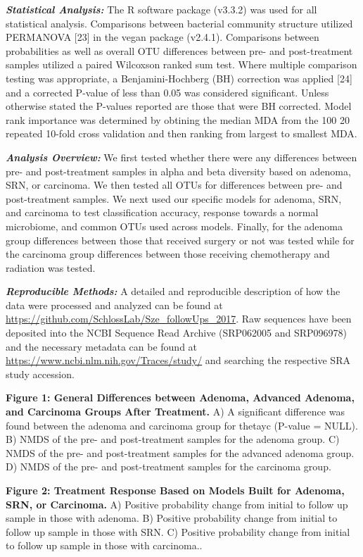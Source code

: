 \documentclass[12pt,]{article}
\begin{document}
\textbf{\emph{Statistical Analysis:}} The R software package (v3.3.2)
was used for all statistical analysis. Comparisons between bacterial
community structure utilized PERMANOVA {[}23{]} in the vegan package
(v2.4.1). Comparisons between probabilities as well as overall OTU
differences between pre- and post-treatment samples utilized a paired
Wilcoxson ranked sum test. Where multiple comparison testing was
appropriate, a Benjamini-Hochberg (BH) correction was applied {[}24{]}
and a corrected P-value of less than 0.05 was considered significant.
Unless otherwise stated the P-values reported are those that were BH
corrected. Model rank importance was determined by obtining the median
MDA from the 100 20 repeated 10-fold cross validation and then ranking
from largest to smallest MDA.

\textbf{\emph{Analysis Overview:}} We first tested whether there were
any differences between pre- and post-treatment samples in alpha and
beta diversity based on adenoma, SRN, or carcinoma. We then tested all
OTUs for differences between pre- and post-treatment samples. We next
used our specific models for adenoma, SRN, and carcinoma to test
classification accuracy, response towards a normal microbiome, and
common OTUs used across models. Finally, for the adenoma group
differences between those that received surgery or not was tested while
for the carcinoma group differences between those receiving chemotherapy
and radiation was tested.

\textbf{\emph{Reproducible Methods:}} A detailed and reproducible
description of how the data were processed and analyzed can be found at
\url{https://github.com/SchlossLab/Sze_followUps_2017}. Raw sequences
have been deposited into the NCBI Sequence Read Archive (SRP062005 and
SRP096978) and the necessary metadata can be found at
\url{https://www.ncbi.nlm.nih.gov/Traces/study/} and searching the
respective SRA study accession.

\newpage

\textbf{Figure 1: General Differences between Adenoma, Advanced Adenoma,
and Carcinoma Groups After Treatment.} A) A significant difference was
found between the adenoma and carcinoma group for thetayc (P-value =
NULL). B) NMDS of the pre- and post-treatment samples for the adenoma
group. C) NMDS of the pre- and post-treatment samples for the advanced
adenoma group. D) NMDS of the pre- and post-treatment samples for the
carcinoma group.

\textbf{Figure 2: Treatment Response Based on Models Built for Adenoma,
SRN, or Carcinoma.} A) Positive probability change from initial to
follow up sample in those with adenoma. B) Positive probability change
from initial to follow up sample in those with SRN. C) Positive
probability change from initial to follow up sample in those with
carcinoma..
\end{document}
